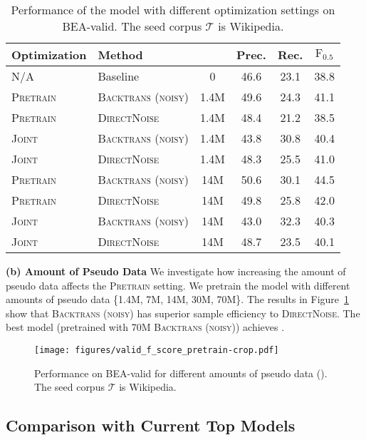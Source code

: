 \documentclass[11pt,a4paper]{article}
\newcommand{\backtrans}{\textsc{Backtrans (noisy)}}
\newcommand{\directnoise}{\textsc{DirectNoise}}
\newcommand{\joint}{\textsc{Joint}}
\newcommand{\pretrain}{\textsc{Pretrain}}
\newcommand{\seedcorpus}{\ensuremath{\mathcal{T}}}
\newcommand{\fscore}{\ensuremath{\mathrm{F}_{0.5}}}
\begin{document}
\begin{table}[t!]
\centering
\small
\tabcolsep 1.5pt
\begin{tabular}{llcccc}
\toprule
Optimization & Method &  & \multicolumn{1}{c}{Prec.} & \multicolumn{1}{c}{Rec.} & \multicolumn{1}{c}{\fscore{}}  \\
\midrule
N/A         & Baseline        & 0    &  46.6  &  23.1  &  38.8  \\
\midrule
\pretrain{} &\backtrans{}     & 1.4M &  49.6  &  24.3  &  41.1  \\
\pretrain{} &\directnoise{}   & 1.4M &  48.4  &  21.2  &  38.5  \\
\joint{}    &\backtrans{}     & 1.4M &  43.8  &  30.8  &  40.4  \\
\joint{}    &\directnoise{}   & 1.4M &  48.3  &  25.5  &  41.0  \\
\midrule
\pretrain{} &\backtrans{}     & 14M  &  50.6  &  30.1  &  44.5  \\
\pretrain{} &\directnoise{}   & 14M  &  49.8  &  25.8  &  42.0  \\
\joint{}    &\backtrans{}     & 14M  &  43.0  &  32.3  &  40.3  \\
\joint{}    &\directnoise{}   & 14M  &  48.7  &  23.5  &  40.1  \\
\bottomrule
\end{tabular}
\vskip -2mm
\caption{Performance of the model with different optimization settings on BEA-valid. The seed corpus \seedcorpus{} is Wikipedia.}
\label{table:joint-or-pretrain}
\end{table}

\noindent\textbf{(b) Amount of Pseudo Data}\hspace*{3mm}
We investigate how increasing the amount of pseudo data affects the \pretrain{} setting.
We pretrain the model with different amounts of pseudo data \{1.4M, 7M, 14M, 30M, 70M\}.
The results in Figure~\ref{fig:amount-of-pseudo-data} show that \backtrans{} has superior sample efficiency to \directnoise{}.
The best model (pretrained with 70M \backtrans{}) achieves .

\begin{figure}[t!]
  \center
  \texttt{[image: figures/valid\_f\_score\_pretrain-crop.pdf]}
  \vskip -3mm
  \caption{Performance on BEA-valid for different amounts of pseudo data (). The seed corpus \seedcorpus{} is Wikipedia.}
  \label{fig:amount-of-pseudo-data}
\end{figure}

\subsection{Comparison with Current Top Models}
\label{subsec:comparison-with-other-studies}
\end{document}
